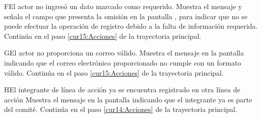  \begin{UCtrayectoriaA}{F}{El actor no ingresó un dato marcado como requerido.}
    \UCpaso[\UCsist] Muestra el mensaje  y
    señala el campo que presenta la omisión en la pantalla , para indicar que
    no se puede efectuar la operación de registro debido a la falta de información requerida.
   \UCpaso[] Continúa en el paso \ref{cur15:Acciones} de la trayectoria principal.
 \end{UCtrayectoriaA}
 
 \begin{UCtrayectoriaA}{G}{El actor no proporciona un correo válido.}
    \UCpaso[\UCsist] Muestra el mensaje  en la pantalla  indicando que el correo electrónico proporcionado no cumple con un formato válido.
    \UCpaso Continúa en el paso \ref{cur15:Acciones} de la trayectoria principal.
 \end{UCtrayectoriaA}
  \begin{UCtrayectoriaA}{H}{El integrante de línea de acción ya se encuentra registrado en otra línea de acción}
    \UCpaso[\UCsist] Muestra el mensaje  en la pantalla  indicando que el integrante ya es parte del comité. 
    \UCpaso Continúa en el paso \ref{cur14:Acciones} de la trayectoria principal.
 \end{UCtrayectoriaA}